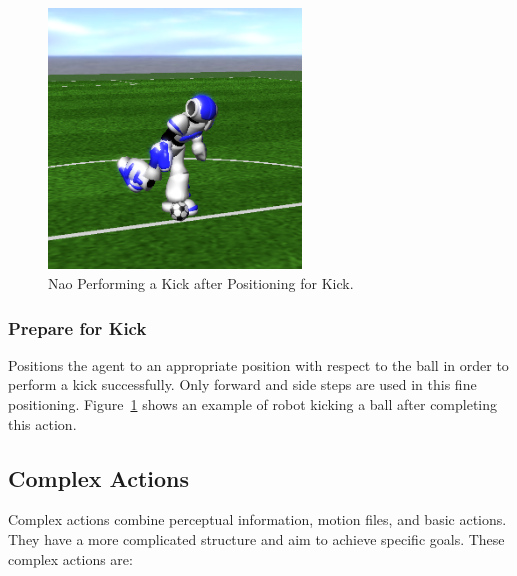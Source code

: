 \begin{figure}[t!]
  \centering
  \includegraphics[trim=0cm 3cm 0cm 4cm, clip,width=0.6\textwidth]{Chapter3/figures/NaoKick.png}
  \caption{Nao Performing a Kick after Positioning for Kick.}
  \label{fig:NaoKick}
\end{figure}
  
\subsubsection*{Prepare for Kick} 
Positions the agent to an appropriate position with respect to the ball in order to perform a kick successfully. Only forward and side steps are used in this fine positioning. Figure~\ref{fig:NaoKick} shows an example of robot kicking a ball after completing this action.
  
\subsection{Complex Actions}
Complex actions combine perceptual information, motion files, and basic actions. They have a more complicated structure and aim to achieve specific goals. These complex actions are:





